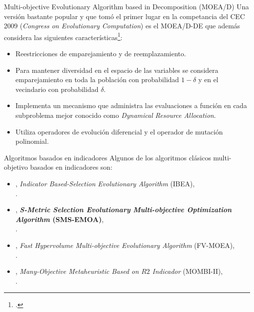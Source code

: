 \documentclass{beamer}
\begin{document}
\begin{frame}{Multi-objective Evolutionary Algorithm based in Decomposition (MOEA/D)}
\scriptsize
Una versión bastante popular y que tomó el primer lugar en la competancia del CEC 2009 (\textit{Congress on Evolutionary Computation}) es el  MOEA/D-DE que además considera las siguientes características\footcite{li2009multiobjective}: 
\begin{itemize}
\scriptsize
    \item Reestricciones de emparejamiento y de reemplazamiento.
    \item Para mantener diversidad en el espacio de las variables se considera emparejamiento en toda la población con probabilidad $1 - \delta$ y en el vecindario con probabilidad $\delta$. 
    \item Implementa un mecanismo que administra las evaluaciones a función en cada subproblema mejor conocido como \textit{Dynamical Resource Allocation}.
    \item Utiliza operadores de evolución diferencial y el operador de mutación polinomial.
\end{itemize}
\end{frame}



\begin{frame}{Algoritmos basados en indicadores}
Algunos de los algoritmos clásicos multi-objetivo basados en indicadores son:
\begin{itemize}
\scriptsize
   \item \citeyear{Joel:IBEA}, \textit{Indicator Based-Selection Evolutionary Algorithm } (IBEA), \\ \citeauthor{Joel:IBEA}.
   \item \citeyear{Joel:SMSEMOA}, \textbf{\textit{S-Metric Selection Evolutionary Multi-objective Optimization Algorithm} (SMS-EMOA)}, \\ \citeauthor{Joel:SMSEMOA}.
   \item \citeyear{Joel:FV-MOEA}, \textit{Fast Hypervolume Multi-objective Evolutionary Algorithm} (FV-MOEA), \\ \citeauthor{Joel:FV-MOEA}.
   \item \citeyear{Joel:MOMBI-II}, \textit{Many-Objective Metaheuristic Based on $R2$ Indicador} (MOMBI-II), \\ \citeauthor{Joel:MOMBI-II}.
\end{itemize}
\end{frame}
\end{document}
